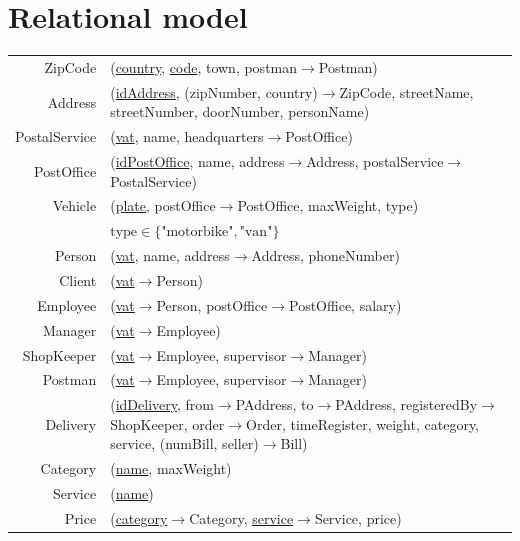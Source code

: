\documentclass{report}[a4paper]
\theoremstyle{remark}
\begin{document}
\chapter{Relational model}
\begin{center} \setlength{\tabcolsep}{1pt}
    \begin{tabular}{r p{144mm}}
        ZipCode         & (\uline{country}, \uline{code}, town, postman$\rightarrow$Postman)  \\
        Address         & (\uline{idAddress}, (zipNumber, country)$\rightarrow$ZipCode, streetName, streetNumber, doorNumber, personName) \\
        PostalService   & (\uline{vat}, name, headquarters$\rightarrow$PostOffice)              \\
        PostOffice      & (\uline{idPostOffice}, name, address$\rightarrow$Address, postalService$\rightarrow$PostalService) \\
        Vehicle         & (\uline{plate}, postOffice$\rightarrow$PostOffice, maxWeight, type) \\
                        & $\text{type} \in \{\text{"motorbike"}, \text{"van"}\}$\\
        Person          & (\uline{vat}, name, address$\rightarrow$Address, phoneNumber)         \\
        Client          & (\uline{vat}$\rightarrow$Person)                                      \\
        Employee        & (\uline{vat}$\rightarrow$Person, postOffice$\rightarrow$PostOffice, salary) \\
        Manager         & (\uline{vat}$\rightarrow$Employee)                                    \\
        ShopKeeper      & (\uline{vat}$\rightarrow$Employee, supervisor$\rightarrow$Manager)    \\
        Postman         & (\uline{vat}$\rightarrow$Employee, supervisor$\rightarrow$Manager)    \\
        Delivery        & (\uline{idDelivery}, from$\rightarrow$PAddress, to$\rightarrow$PAddress, registeredBy$\rightarrow$ShopKeeper, order$\rightarrow$Order, timeRegister, weight, category, service, (numBill, seller)$\rightarrow$Bill) \\
        Category        & (\uline{name}, maxWeight) \\
        Service         & (\uline{name}) \\
        Price           & (\uline{category}$\rightarrow$Category, \uline{service}$\rightarrow$Service, price) \\

\end{tabular}
\end{center}
\end{document}
